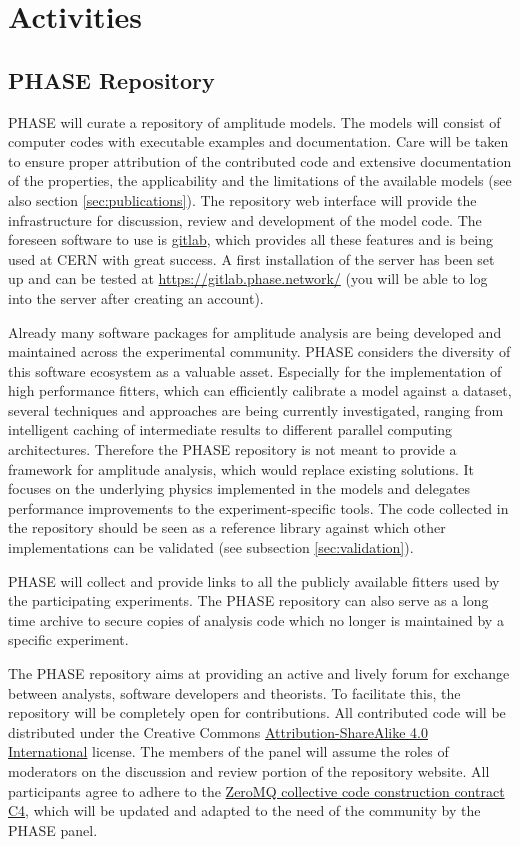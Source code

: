 \section{Activities}
\label{sec:activities}

\subsection{PHASE Repository}
\label{sec:repo}
PHASE will curate a repository of amplitude models. The models will consist of computer codes with executable examples and documentation. Care will be taken to ensure proper attribution of the contributed code and extensive documentation of the properties, the applicability and the limitations of the available models (see also section \ref{sec:publications}). The repository web interface will provide the infrastructure for discussion, review and development of the model code. The foreseen software to use is \href{https://about.gitlab.com/}{gitlab}, which provides all these features and is being used at CERN with great success. A first installation of the server has been set up and can be tested at \url{https://gitlab.phase.network/} (you will be able to log into the server after creating an account).

Already many software packages for amplitude analysis are being developed and maintained across the experimental community. PHASE considers the diversity of this software ecosystem as a valuable asset. Especially for the implementation of high performance fitters, which can efficiently calibrate a model against a dataset, several techniques and approaches are being currently investigated, ranging from intelligent caching of intermediate results to different parallel computing architectures. Therefore the PHASE repository is not meant to provide a framework for amplitude analysis, which would replace existing solutions. It focuses on the underlying physics implemented in the models and delegates performance improvements to the experiment-specific tools. The code collected in the repository should be seen as a reference library against which other implementations can be validated (see subsection \ref{sec:validation}). 

PHASE will collect and provide links to all the publicly available fitters used by the participating experiments. The PHASE repository can also serve as a long time archive to secure copies of analysis code which no longer is maintained by a specific experiment.

The PHASE repository aims at providing an active and lively forum for exchange between analysts, software developers and theorists. To facilitate this, the repository will be completely open for contributions. All contributed code will be distributed under the Creative Commons
\href{https://creativecommons.org/licenses/by-sa/4.0/}{Attribution-ShareAlike 4.0 International} license. The members of the panel will assume the roles of moderators on the discussion and review portion of the repository website. All participants agree to adhere to the \href{https://rfc.zeromq.org/spec:42/C4/}{ZeroMQ collective code construction contract C4}, which will be updated and adapted to the need of the community by the PHASE panel.


